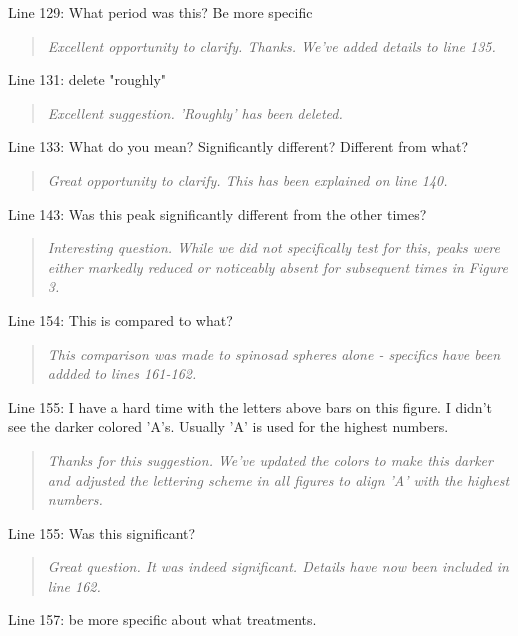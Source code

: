 \documentclass{article}
\begin{document}
Line 129: What period was this? Be more specific

\begin{quote}
    \textit{Excellent opportunity to clarify.  Thanks.  We've added details to line 135.
    }
\end{quote}

Line 131: delete "roughly"

\begin{quote}
    \textit{Excellent suggestion.  'Roughly' has been deleted.  }
\end{quote}

Line 133: What do you mean? Significantly different? Different from what?

\begin{quote}
    \textit{Great opportunity to clarify.  This has been explained on line 140.
    }
\end{quote}

Line 143: Was this peak significantly different from the other times?

\begin{quote}
    \textit{Interesting question.  While we did not specifically test for this, peaks were either markedly reduced or noticeably absent for subsequent times in Figure 3.  }
\end{quote}

Line 154: This is compared to what?

\begin{quote}
    \textit{This comparison was made to spinosad spheres alone - specifics have been addded to lines 161-162.
    }
\end{quote}

Line 155: I have a hard time with the letters above bars on this figure. I didn't see the darker colored 'A's. Usually 'A' is used for the highest numbers.

\begin{quote}
    \textit{Thanks for this suggestion.  We've updated the colors to make this darker and adjusted the lettering scheme in all figures to align 'A' with the highest numbers.  }
\end{quote}

Line 155: Was this significant?

\begin{quote}
    \textit{Great question.  It was indeed significant.  Details have now been included in line 162. 
    }
\end{quote}

Line 157: be more specific about what treatments.  
\end{document}
